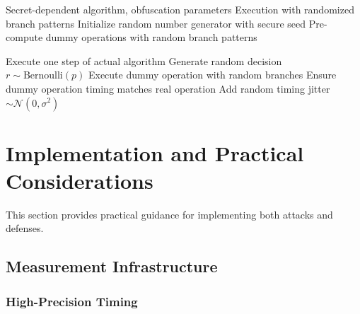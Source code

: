 \documentclass[11pt,a4paper]{article}
\theoremstyle{definition}
\begin{document}
\begin{algorithm}
\caption{Dynamic Branch Pattern Obfuscation}
\begin{algorithmic}[1]
\REQUIRE Secret-dependent algorithm, obfuscation parameters
\ENSURE Execution with randomized branch patterns
\STATE Initialize random number generator with secure seed
\STATE Pre-compute dummy operations with random branch patterns

    \STATE Execute one step of actual algorithm
    \STATE Generate random decision $r \sim \text{Bernoulli}(p)$
        \STATE Execute dummy operation with random branches
        \STATE Ensure dummy operation timing matches real operation
    \ENDIF
    \STATE Add random timing jitter $\sim \mathcal{N}(0, \sigma^2)$
\ENDWHILE
\end{algorithmic}
\end{algorithm}

\section{Implementation and Practical Considerations}

This section provides practical guidance for implementing both attacks and defenses.

\subsection{Measurement Infrastructure}

\subsubsection{High-Precision Timing}
\end{document}

